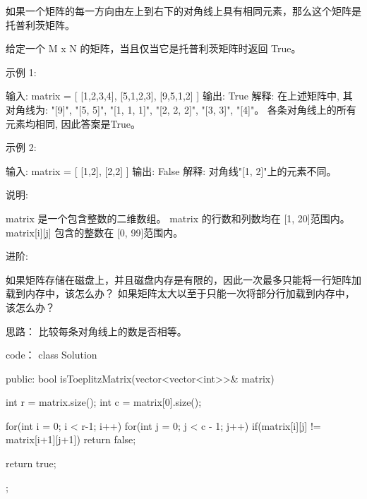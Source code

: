 如果一个矩阵的每一方向由左上到右下的对角线上具有相同元素，那么这个矩阵是托普利茨矩阵。

给定一个 M x N 的矩阵，当且仅当它是托普利茨矩阵时返回 True。

示例 1:

输入: 
matrix = [
  [1,2,3,4],
  [5,1,2,3],
  [9,5,1,2]
]
输出: True
解释:
在上述矩阵中, 其对角线为:
"[9]", "[5, 5]", "[1, 1, 1]", "[2, 2, 2]", "[3, 3]", "[4]"。
各条对角线上的所有元素均相同, 因此答案是True。

示例 2:

输入:
matrix = [
  [1,2],
  [2,2]
]
输出: False
解释: 
对角线"[1, 2]"上的元素不同。

说明:

     matrix 是一个包含整数的二维数组。
    matrix 的行数和列数均在 [1, 20]范围内。
    matrix[i][j] 包含的整数在 [0, 99]范围内。

进阶:

    如果矩阵存储在磁盘上，并且磁盘内存是有限的，因此一次最多只能将一行矩阵加载到内存中，该怎么办？
    如果矩阵太大以至于只能一次将部分行加载到内存中，该怎么办？


























思路：
比较每条对角线上的数是否相等。






























code：
class Solution {
public:
    bool isToeplitzMatrix(vector<vector<int>>& matrix) {
        int r = matrix.size();
        int c = matrix[0].size();
        
        for(int i = 0; i < r-1; i++)
            for(int j = 0; j < c - 1; j++)
            {
                if(matrix[i][j] != matrix[i+1][j+1]) return false;
            }
        
        return true;
    }
};